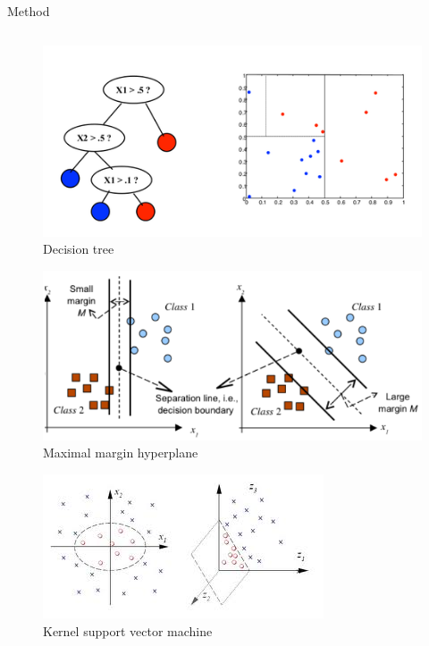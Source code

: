 \documentclass[final,hyperref={pdfpagelabels=false}]{beamer}
\begin{document}
\begin{frame}[t]
\begin{columns}[t]
\begin{column}{.465\textwidth}
\begin{block}{Method}
\begin{columns}
\begin{column}{.4\textwidth}
\begin{figure}
\includegraphics[width=1\linewidth]{decision_tree.png}
\caption{Decision tree}
\end{figure}

\begin{figure}
\includegraphics[width=1\linewidth]{svm-core.png}
\caption{Maximal margin hyperplane}
\end{figure}


\begin{figure}
\includegraphics[width=1\linewidth]{kernel-trick.jpeg}
\caption{Kernel support vector machine}
\end{figure}



\end{column}
\end{columns}
\end{block}
\end{column}
\end{columns}
\end{frame}
\end{document}
